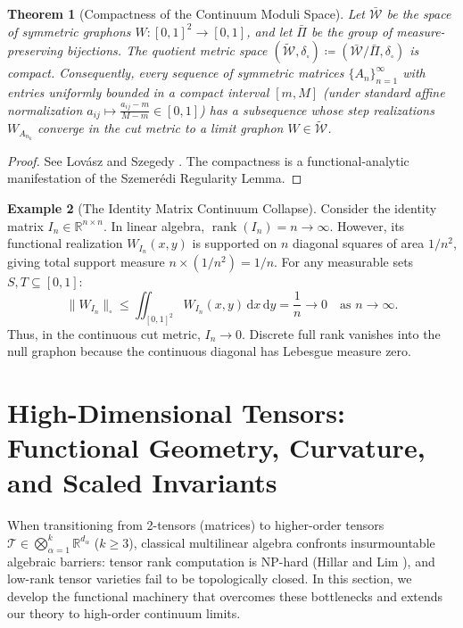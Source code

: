 \documentclass[11pt,a4paper,reqno]{amsart}
\newtheorem{theorem}{Theorem}[section]
\theoremstyle{definition}
\newtheorem{example}[theorem]{Example}
\numberwithin{equation}{section}
\providecommand{\R}{\mathbb{R}}
\newcommand{\rank}{\operatorname{rank}}
\providecommand{\cutnorm}[1]{\|#1\|_{\square}}
\newcommand{\dif}{\,\mathrm{d}}
\providecommand{\R}{\mathbb{R}}
\providecommand{\cutnorm}[1]{\|#1\|_{\square}}
\begin{document}
\begin{theorem}[Compactness of the Continuum Moduli Space]
\label{thm:graphon_compactness}
Let $\bar{\mathcal{W}}$ be the space of symmetric graphons $W \colon [0, 1]^2 \to [0, 1]$, and let $\bar{\Pi}$ be the group of measure-preserving bijections. The quotient metric space $(\widetilde{\mathcal{W}}, \delta_\square) \coloneqq (\bar{\mathcal{W}} / \bar{\Pi}, \delta_\square)$ is \emph{compact}. Consequently, every sequence of symmetric matrices $\{A_n\}_{n=1}^\infty$ with entries uniformly bounded in a compact interval $[m, M]$ (under standard affine normalization $a_{ij} \mapsto \frac{a_{ij} - m}{M - m} \in [0, 1]$) has a subsequence whose step realizations $W_{A_{n_k}}$ converge in the cut metric to a limit graphon $W \in \widetilde{\mathcal{W}}$.
\end{theorem}
\begin{proof}
See Lov\'asz and Szegedy \cite{lovasz2006limits}. The compactness is a functional-analytic manifestation of the Szemer\'edi Regularity Lemma.
\end{proof}

\begin{example}[The Identity Matrix Continuum Collapse]
Consider the identity matrix $I_n \in \R^{n \times n}$. In linear algebra, $\rank(I_n) = n \to \infty$. However, its functional realization $W_{I_n}(x, y)$ is supported on $n$ diagonal squares of area $1/n^2$, giving total support measure $n \times (1/n^2) = 1/n$. For any measurable sets $S, T \subseteq [0, 1]$:
\begin{equation}
    \cutnorm{W_{I_n}} \le \iint_{[0,1]^2} W_{I_n}(x, y) \dif x \dif y = \frac{1}{n} \longrightarrow 0 \quad \text{as } n \to \infty.
\end{equation}
Thus, in the continuous cut metric, $I_n \to 0$. Discrete full rank vanishes into the null graphon because the continuous diagonal has Lebesgue measure zero.
\end{example}

\section{High-Dimensional Tensors: Functional Geometry, Curvature, and Scaled Invariants}
\label{sec:tensors}

When transitioning from 2-tensors (matrices) to higher-order tensors $\mathcal{T} \in \bigotimes_{\alpha=1}^k \R^{d_\alpha}$ ($k \ge 3$), classical multilinear algebra confronts insurmountable algebraic barriers: tensor rank computation is NP-hard (Hillar and Lim \cite{lim2005singular}), and low-rank tensor varieties fail to be topologically closed. In this section, we develop the functional machinery that overcomes these bottlenecks and extends our theory to high-order continuum limits.
\end{document}
